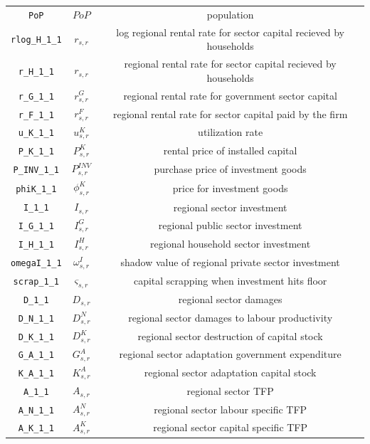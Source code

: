 \begin{center}
\begin{longtable}{ccc}
\texttt{PoP} & $PoP$ & population\\
\texttt{rlog\_H\_1\_1} & ${r_{s,r}}$ & log regional rental rate for sector capital recieved by households\\
\texttt{r\_H\_1\_1} & ${r_{s,r}}$ & regional rental rate for sector capital recieved by households\\
\texttt{r\_G\_1\_1} & ${r^G_{s,r}}$ & regional rental rate for government sector capital\\
\texttt{r\_F\_1\_1} & ${r^F_{s,r}}$ & regional rental rate for sector capital paid by the firm\\
\texttt{u\_K\_1\_1} & ${u^K_{s,r}}$ & utilization rate\\
\texttt{P\_K\_1\_1} & ${P^K_{s,r}}$ & rental price of installed capital\\
\texttt{P\_INV\_1\_1} & ${P^{INV}_{s,r}}$ & purchase price of investment goods\\
\texttt{phiK\_1\_1} & ${\phi^K_{s,r}}$ & price for investment goods\\
\texttt{I\_1\_1} & ${I_{s,r}}$ & regional sector investment\\
\texttt{I\_G\_1\_1} & ${I^G_{s,r}}$ & regional public sector investment\\
\texttt{I\_H\_1\_1} & ${I^H_{s,r}}$ & regional household sector investment\\
\texttt{omegaI\_1\_1} & ${\omega^I_{s,r}}$ & shadow value of regional private sector investment\\
\texttt{scrap\_1\_1} & ${\varsigma_{s,r}}$ & capital scrapping when investment hits floor\\
\texttt{D\_1\_1} & ${D_{s,r}}$ & regional sector damages\\
\texttt{D\_N\_1\_1} & ${D^N_{s,r}}$ & regional sector damages to labour productivity\\
\texttt{D\_K\_1\_1} & ${D^K_{s,r}}$ & regional sector destruction of capital stock\\
\texttt{G\_A\_1\_1} & ${G^{A}_{s,r}}$ & regional sector adaptation government expenditure\\
\texttt{K\_A\_1\_1} & ${K^{A}_{s,r}}$ & regional sector adaptation capital stock\\
\texttt{A\_1\_1} & ${A_{s,r}}$ & regional sector TFP\\
\texttt{A\_N\_1\_1} & ${A^{N}_{s,r}}$ & regional sector labour specific TFP\\
\texttt{A\_K\_1\_1} & ${A^{K}_{s,r}}$ & regional sector capital specific TFP\\

\end{longtable}
\end{center}
